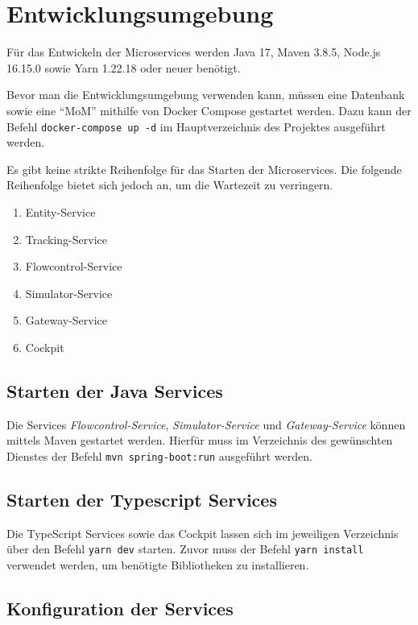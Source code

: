 \section{Entwicklungsumgebung}

Für das Entwickeln der Microservices werden Java 17, Maven 3.8.5, Node.js 16.15.0 sowie Yarn 1.22.18 oder neuer benötigt.

Bevor man die Entwicklungsumgebung verwenden kann, müssen eine Datenbank sowie eine \enquote{MoM} mithilfe von Docker Compose gestartet werden.
Dazu kann der Befehl \verb|docker-compose up -d| im Hauptverzeichnis des Projektes ausgeführt werden.

Es gibt keine strikte Reihenfolge für das Starten der Microservices.
Die folgende Reihenfolge bietet sich jedoch an, um die Wartezeit zu verringern. 

\begin{enumerate}
	\item Entity-Service
	\item Tracking-Service
	\item Flowcontrol-Service
	\item Simulator-Service
	\item Gateway-Service
	\item Cockpit
\end{enumerate}

\subsection{Starten der Java Services}

Die Services \textit{Flowcontrol-Service}, \textit{Simulator-Service} und \textit{Gateway-Service} können mittels Maven gestartet werden.
Hierfür muss im Verzeichnis des gewünschten Dienstes der Befehl \verb|mvn spring-boot:run| ausgeführt werden.

\subsection{Starten der Typescript Services}

Die TypeScript Services sowie das Cockpit lassen sich im jeweiligen Verzeichnis über den Befehl \verb|yarn dev| starten.
Zuvor muss der Befehl \verb|yarn install| verwendet werden, um benötigte Bibliotheken zu installieren. 

\subsection{Konfiguration der Services}

